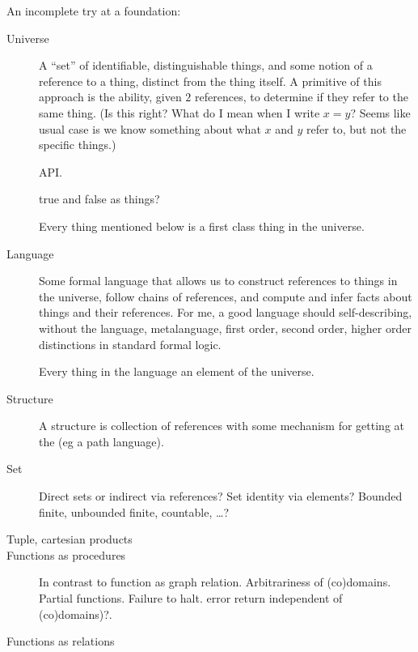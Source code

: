 \documentclass[11pt,openany]{article}
\begin{document}
An incomplete try at a foundation:
\begin{description}

\item[Universe] A ``set'' of identifiable, distinguishable
things,
and some notion of a reference to a thing, distinct from the thing
itself.
A primitive of this approach is the ability, given $2$ references,
to determine if they refer to the same thing.
(Is this right? What do I mean when I write $x=y$?
Seems like usual case is we know something about what $x$ and $y$
refer to, but not the specific things.)
\par
API. 
\par
\textsf{true} and \textsf{false} as things?
\par
Every thing mentioned below is a first class thing in the universe.

\item[Language] Some formal language that allows us 
to construct references to things in the universe, 
follow chains of references, and compute and infer facts 
about things and their references. 
For me, a good language should self-describing, without the
language, metalanguage, first order, second order, higher order 
distinctions in standard formal logic.
\par
Every thing in the language an element of the universe.

\item[Structure] A structure is collection of references with
some mechanism for getting at the (eg a path language).

\item[Set] Direct sets or indirect via references?
Set identity via elements?
Bounded finite, unbounded finite, countable, \ldots ?

\item[Tuple, cartesian products]

\item[Functions as procedures]
In contrast to function as graph relation.
Arbitrariness of (co)domains. Partial functions. Failure to halt.
error return independent of (co)domains)?.

\item[Functions as relations]
\end{description}
\end{document}
